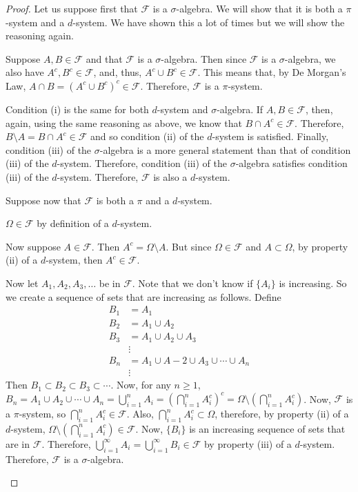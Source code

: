 \begin{proof}
Let us suppose first that $\mathcal F$ is a $\sigma$-algebra. We will show that it is both a $\pi$-system and a $d$-system. We have shown this a lot of times but we will show the reasoning again.

Suppose $A, B\in \mathcal F$ and that $\mathcal F$ is a $\sigma$-algebra. Then since $\mathcal F$ is a $\sigma$-algebra, we also have $A^c, B^c\in \mathcal F$, and, thus, $A^c\cup B^c\in \mathcal F$. This means that, by De Morgan's Law, $A\cap B=(A^c\cup B^c)^c\in\mathcal F$. Therefore, $\mathcal F$ is a $\pi$-system. 

Condition (i) is the same for both $d$-system and $\sigma$-algebra. If $A, B\in \mathcal F$, then, again, using the same reasoning as above, we know that $B\cap A^c\in\mathcal F$. Therefore, $B\setminus A=B\cap A^c\in\mathcal F$ and so condition (ii) of the $d$-system is satisfied. Finally, condition (iii) of the $\sigma$-algebra is a more general statement than that of condition (iii) of the $d$-system. Therefore, condition (iii) of the $\sigma$-algebra satisfies condition (iii) of the $d$-system. Therefore, $\mathcal F$ is also a $d$-system.


Suppose now that $\mathcal F$ is both a $\pi$ and a $d$-system.

\begin{prooflist}
\item $\Omega\in\mathcal F$ by definition of a $d$-system.
\item Now suppose $A\in \mathcal F$. Then $A^c=\Omega\setminus A$. But since $\Omega\in\mathcal F$ and $A\subset \Omega$, by property (ii) of a $d$-system, then $A^c\in \mathcal F$.
\item Now let $A_1,A_2,A_3,\ldots$ be in $\mathcal F$. Note that we don't know if $\{A_i\}$ is increasing. So we create a sequence of sets that are increasing as follows. Define
\begin{align*}
B_1&=A_1\\
B_2&=A_1\cup A_2\\
B_3&=A_1\cup A_2 \cup A_3\\
&\vdots  \\
B_n&=A_1\cup A-2\cup A_3 \cup \cdots \cup A_n\\
&\vdots
\end{align*} 
Then $B_1\subset B_2\subset B_3\subset \cdots$. Now, for any $n\geq 1$, $B_n=A_1\cup A_2\cup \cdots \cup A_n=\bigcup_{i=1}^n A_i=\left(\bigcap_{i=1}^n A_i^c\right)^c = \Omega\setminus \left(\bigcap_{i=1}^n A_i^c\right) $. Now, $\mathcal F$ is a $\pi$-system, so $\bigcap_{i=1}^n A_i^c\in\mathcal F$. Also, $\bigcap_{i=1}^n A_i^c\subset \Omega$, therefore, by property (ii) of a $d$-system, $\Omega\setminus \left(\bigcap_{i=1}^n A_i^c\right)\in \mathcal F$. Now, $\{B_i\}$ is an increasing sequence of sets that are in $\mathcal F$. Therefore, $\bigcup_{i=1}^\infty A_i=\bigcup_{i=1}^\infty B_i\in \mathcal F$ by property (iii) of a $d$-system. Therefore, $\mathcal F$ is a $\sigma$-algebra.
\end{prooflist}

\end{proof}

